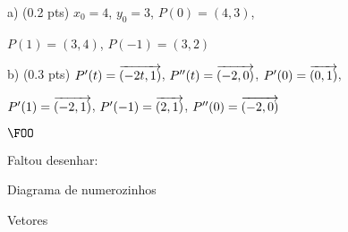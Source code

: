 \documentclass[oneside,12pt]{article}
\begin{document}


a) \B(0.2 pts)
   $x_0=4$,
   $y_0=3$,
   $P(0) = (4, 3)$,

   $P(1) = (3, 4)$,
   $P(-1) = (3, 2)$

b) \B(0.3 pts)
   $P'(t)  = {\overrightarrow{(-2t, 1)}}$,
   $P''(t) = {\overrightarrow{(-2, 0)}}$,
   $P'(0)  = {\overrightarrow{(0, 1)}}$,

   $P'(1)  = {\overrightarrow{(- 2, 1)}}$,
   $P'(-1) = {\overrightarrow{(2, 1)}}$,
   $P''(0) = {\overrightarrow{(- 2, 0)}}$

\msk



\pu












\unitlength=15pt

$\FOO$

Faltou desenhar:

Diagrama de numerozinhos

Vetores





\msk














\end{document}
